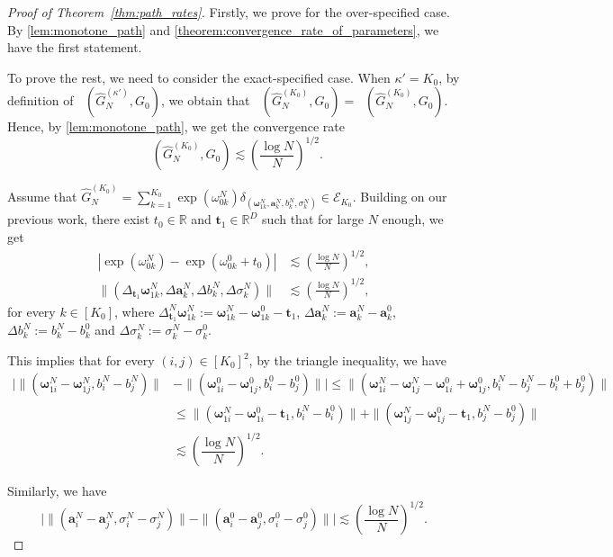 \documentclass[twoside]{article}
\DeclareMathOperator*{\VDFRA}{D_{FRA}}
\DeclareMathOperator*{\VDE}{D_{E}}
\theoremstyle{plain}
\theoremstyle{definition}
\theoremstyle{plain}
\def\vomega{{\bm{\omega}}}
\def\va{{\bm{a}}}
\def\vt{{\bm{t}}}
\begin{document}
\begin{proof}[Proof of Theorem~\ref{thm:path_rates}]
    Firstly, we prove for the over-specified case. By \cref{lem:monotone_path} and \cref{theorem:convergence_rate_of_parameters}, we have the first statement.

    To prove the rest, we need to consider the exact-specified case. When $\kappa' = K_0$, by definition of $\VDFRA (\widehat{G}^{(\kappa')}_N, G_0)$, we obtain that $\VDFRA (\widehat{G}^{(K_0)}_N, G_0) = \VDE (\widehat{G}^{(K_0)}_N, G_0)$. Hence, by \cref{lem:monotone_path}, we get the convergence rate $$\VDE (\widehat{G}^{(K_0)}_N, G_0) \lesssim \left( \frac{\log N}{N} \right)^{1/2}.$$

    Assume that $\widehat{G}^{(K_0)}_N = \sum_{k = 1}^{K_0} \exp(\omega_{0k}^{N}) \delta_{(\vomega_{1k}^{N}, \va^N_k, b^N_k, \sigma^N_k)} \in \mathcal{E}_{K_0}$. Building on our previous work, there exist $t_0 \in \mathbb{R}$ and $\vt_1 \in \mathbb{R}^D$ such that for large $N$ enough, we get
    \begin{align}
        |\exp(\omega_{0k}^N) - \exp(\omega_{0k}^{0} + t_{0})| &\lesssim \left(\frac{\log N}{N}\right)^{1/2},\nonumber \\
        \|(\Delta_{\vt_{1}} \vomega_{1k}^N, \Delta \va_{k}^N,  \Delta b_{k}^N, \Delta \sigma_{k}^N)\| &\lesssim \left(\frac{\log N}{N}\right)^{1/2},\nonumber
    \end{align}
    for every $k \in [K_0]$, where $\Delta_{\vt_{1}}^N \vomega_{1k}^N := \vomega_{1k}^N - \vomega_{1k}^0 - \vt_1$, $\Delta \va_{k}^N := \va_{k}^N - \va_{k}^0$, $\Delta b_{k}^N := b_k^N - b_k^0$ and $\Delta \sigma_{k}^N := \sigma_k^N - \sigma_k^0$.

    This implies that for every $(i, j) \in [K_0]^2$, by the triangle inequality, we have  
    \begin{align*}
            \bigg| \|(\vomega_{1i}^N - \vomega_{1j}^N, b_i^N - b_j^N) \| &- \|(\vomega_{1i}^0 - \vomega_{1j}^0, b_i^0 - b_j^0) \| \bigg| \leq \|(\vomega_{1i}^N - \vomega_{1j}^N - \vomega_{1i}^0 + \vomega_{1j}^0, b_i^N - b_j^N - b_i^0 + b_j^0) \| \\
            &\leq \|(\vomega_{1i}^N - \vomega_{1i}^0 - \vt_1, b_i^N - b_i^0) \| + \|(\vomega_{1j}^N - \vomega_{1j}^0 - \vt_1, b_j^N - b_j^0) \| \\
            &\lesssim \left( \dfrac{\log N}{N} \right)^{1/2}.
        \end{align*}

    Similarly, we have $$\bigg| \|(\va^N_i - \va^N_j, \sigma^N_i - \sigma^N_j)\| - \|(\va^0_i - \va^0_j, \sigma^0_i - \sigma^0_j)\| \bigg| \lesssim \left( \dfrac{\log N}{N} \right)^{1/2}.$$


\end{proof}
\end{document}

